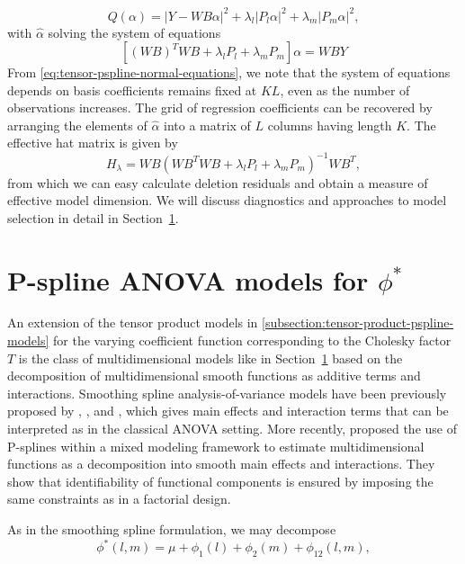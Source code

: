 \documentclass[12pt]{article}
\theoremstyle{definition}
\begin{document}
\begin{equation} \label{eq:tensor-pspline-objective-function}
Q\left(\alpha\right) = \vert Y - WB\alpha \vert^2 + \lambda_l \vert P_l \alpha \vert^2 + \lambda_m \vert P_m \alpha \vert^2,
\end{equation}
\noindent
with $\hat{\alpha}$ solving the system of equations 
\begin{equation} \label{eq:tensor-pspline-normal-equations}
\left[ \left(WB\right)^T WB +  \lambda_l P_l+ \lambda_m P_m\right]\alpha = W B Y
\end{equation}
\noindent
From \ref{eq:tensor-pspline-normal-equations}, we note that the system of equations depends on basis coefficients remains fixed at $KL$, even as the number of observations increases.   The grid of regression coefficients can be recovered by arranging the elements of $\hat{\alpha}$ into a matrix of $L$ columns having length $K$. The effective hat matrix is given by 
\[
H_\lambda = W B\left(W B^T W B +  \lambda_l P_l + \lambda_m P_m \right)^{-1} W B^T,
\]
from which we can easy calculate deletion residuals and obtain a measure of effective model dimension. We will discuss diagnostics and approaches to model selection in detail in Section~\ref{}.

\section{P-spline ANOVA models for $\phi^*$}

An extension of the tensor product models in \ref{subsection:tensor-product-pspline-models} for the varying coefficient function corresponding to the Cholesky factor $T$ is the class of multidimensional models like in Section~\ref{} based on the decomposition of multidimensional smooth functions as additive terms and interactions. Smoothing spline analysis-of-variance models have been previously proposed by \citet{gu1993semiparametric}, \citet{wahba1995smoothing}, and \citet{gu2002smoothing}, which gives main effects and interaction terms that can be interpreted as in the classical ANOVA setting. More recently, \citet{lee2011p} proposed the use of P-splines within a mixed modeling framework to estimate multidimensional functions as a decomposition into smooth main effects and interactions. They show that identifiability of functional components is ensured by imposing the same constraints as in a factorial design. 

As in the smoothing spline formulation, we may decompose
\begin{equation} \label{eq:SANOVA-model}
\phi^*\left(l,m\right) = \mu + \phi_1\left(l\right) + \phi_2\left(m\right) + \phi_{12}\left(l,m\right),
\end{equation} 
\end{document}

